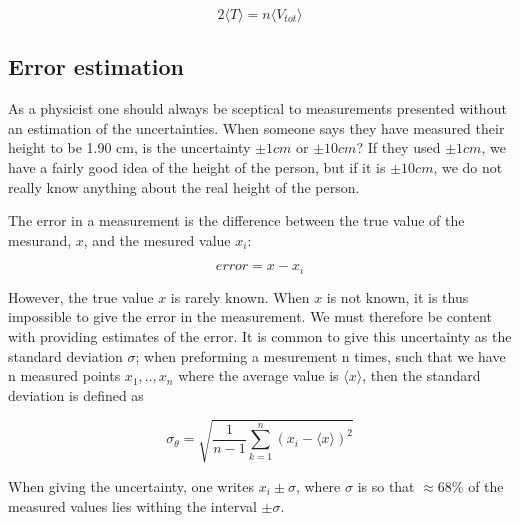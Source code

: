 \documentclass[norsk,a4paper,12pt]{article}
\begin{document}
\begin{equation}
2 \langle T \rangle = n \langle V_{tot} \rangle
\end{equation} 


\subsection{Error estimation} \label{sec:error_estimation}
As a physicist one should always be sceptical to measurements presented without an estimation of the uncertainties. When someone says they have measured their height to be 1.90 cm, is the uncertainty $\pm 1 cm$ or $\pm 10 cm$? If they used $\pm 1 cm$, we have a fairly good idea of the height of the person, but if it is $\pm 10 cm$, we do not really know anything about the real height of the person. 
\par 
\vspace{3mm}
The error in a measurement is the difference between the true value of the mesurand, $x$, and the mesured value $x_i$:

\begin{equation}
	error = x - x_i
\end{equation}

However, the true value $x$ is rarely known. When $x$ is not known, it is thus impossible to give the error in the measurement. We must therefore be content with providing estimates of the error. It is common to give this uncertainty as the standard deviation $\sigma$; when preforming a mesurement n times, such that we have n measured points $x_1, .., x_n$ where the average value is $ \langle x \rangle $, then the standard deviation is defined as

\begin{equation}
\label{eq:standard_dev}
\sigma_{\theta} =  \sqrt{\frac{1}{n-1} \sum_{k=1}^n (x_i - \langle x \rangle)^2}
\end{equation}

When giving the uncertainty, one writes $x_i \pm \sigma$, where $\sigma$ is so that $\approx 68 \%$ of the measured values lies withing the interval $\pm \sigma$. 
\end{document}
